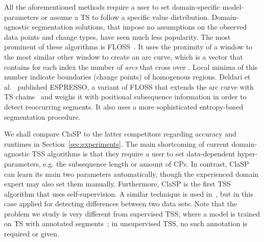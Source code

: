 \documentclass[pdflatex,sn-basic]{sn-jnl}
\begin{document}
All the aforementioned methods require a user to set domain-specific model-parameters or assume a TS to follow a specific value distribution. Domain-agnostic segmentation solutions, that impose no assumptions on the observed data points and change types, have seen much less popularity. The most prominent of these algorithms is FLOSS~\citep{gharghabi2017matrix,Gharghabi2018DomainAO}. It uses the proximity of a window to the most similar other window to create an arc curve, which is a vector that contains for each index  the number of \emph{arcs} that cross over . Local minima of this number indicate boundaries (change points) of homogenous regions. Deldari et al.~\citep{Deldari2020ESPRESSOEA} published ESPRESSO, a variant of FLOSS that extends the arc curve with TS chains~\citep{Zhu2017MatrixPV} and weighs it with positional subsequence information in order to detect reoccurring segments. It also uses a more sophisticated entropy-based segmentation procedure. 

We shall compare ClaSP to the latter  competitors regarding accuracy and runtimes in Section~\ref{sec:experiments}. The main shortcoming of current domain-agnostic TSS algorithms is that they require a user to set data-dependent hyper-parameters, e.g. the subsequence length or amount of CPs. In contrast, ClaSP can learn its main two parameters automatically, though the experienced domain expert may also set them manually. Furthermore, ClaSP is the first TSS algorithm that uses self-supervision. A similar technique is used in~\citep{hido2008unsupervised}, but in this case applied for detecting differences between two data sets. Note that the problem we study is very different from supervised TSS, where a model is trained on TS with annotated segments~\citep{cook2015activity}; in unsupervised TSS, no such annotation is required or given. 
\end{document}
